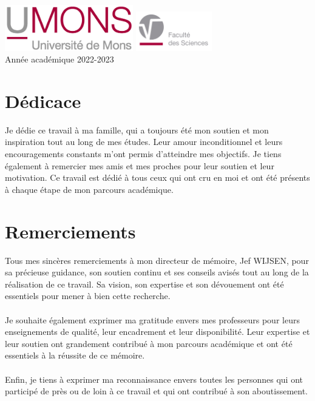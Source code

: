\documentclass[hidelinks,letterpaper,12pt]{article}
\begin{document}
\begin{titlepage}
\vspace*{4cm}
\begin{center}
\includegraphics[height=2cm]{images/UMONS-Logo.jpg}
\hspace{4cm}
\includegraphics[height=1.7cm]{images/FS-logo.jpg}
\\[1em]
Ann\'ee acad\'emique 2022-2023
\end{center}

\thispagestyle{empty}
\end{titlepage}


\newpage
\thispagestyle{empty}
\mbox{}
\newpage
 \section{Dédicace}
 \thispagestyle{empty} %
 Je dédie ce travail à ma famille, qui a toujours été mon soutien et mon inspiration tout au long de mes études. Leur amour inconditionnel et leurs encouragements constants m'ont permis d'atteindre mes objectifs. Je tiens également à remercier mes amis et mes proches pour leur soutien et leur motivation. Ce travail est dédié à tous ceux qui ont cru en moi et ont été présents à chaque étape de mon parcours académique.
 \addtocounter{page}{-1}%
 \newpage
	
	\section{Remerciements}
	\thispagestyle{empty}
 Tous mes sincères remerciements à mon directeur de mémoire, Jef WIJSEN, pour sa précieuse guidance, son soutien continu et ses conseils avisés tout au long de la réalisation de ce travail. Sa vision, son expertise et son dévouement ont été essentiels pour mener à bien cette recherche.
\\ \\
Je souhaite également exprimer ma gratitude envers mes professeurs pour leurs enseignements de qualité, leur encadrement et leur disponibilité. Leur expertise et leur soutien ont grandement contribué à mon parcours académique et ont été essentiels à la réussite de ce mémoire.
\\ \\
Enfin, je tiens à exprimer ma reconnaissance envers toutes les personnes qui ont participé de près ou de loin à ce travail et qui ont contribué à son aboutissement.
\end{document}

